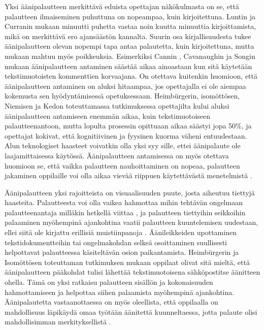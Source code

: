 \documentclass[utf8]{gradu3}
\begin{document}
Yksi äänipalautteen merkittävä eduista opettajan näkökulmasta on se, että palautteen ilmaiseminen puhuttuna on nopeampaa, kuin kirjoitettuna. Luntin ja Curranin \parencite[][]{areYouListening} mukaan minuutti puhetta vastaa noin kuutta minuuttia kirjoittamista, mikä on merkittävä ero ajansäästön kannalta. Suurin osa kirjallisuudesta tukee äänipalautteen olevan nopempi tapa antaa palautetta, kuin kirjoitettuna, mutta mukaan mahtuu myös poikkeuksia. Esimerkiksi Cannin \parencite[][]{engaging}, Cavanaughin ja Songin \parencite[][]{versus} mukaan äänipalautteen antaminen säästää aikaa ainoastaan kun sitä käytetään tekstimuotoisten kommenttien korvaajana. On otettava kuitenkin huomioon, että äänipalautteen antaminen on aluksi hitaampaa, jos opettajalla ei ole aiempaa kokemusta sen hyödyntämisessä opetuksessaan. Heimbürgerin, isomöttösen, Niemisen ja Kedon \parencite[][]{academics} toteuttamassa tutkimuksessa opettajilta kului aluksi äänipalautteen antamiseen enemmän aikaa, kuin tekstimuotoiseen palautteenantoon, mutta lopulta prosessin opittuaan aikaa säästyi jopa 50\%, ja opettajat kokivat, että kognitiivinen ja fyysinen kuorma väheni entuudestaan. Alun teknologiset haasteet voivatkin olla yksi syy sille, ettei äänipalaute ole laajamittaisessa käytössä. Äänipalautteen antamisessa on myös otettava huomioon se, että vaikka palautteen nauhoittaminen on nopeaa, palautteen jakaminen oppilaille voi olla aikaa vievää riippuen käytettävästä menetelmistä \parencite[][]{engaging}.

Äänipalautteen yksi rajoitteista on visuaalisuuden puute, josta aiheutuu tiettyjä haasteita. Palautteesta voi olla vaikea hahmottaa mihin tehtävän ongelmaan palautteenantaja milläkin hetkellä viittaa \parencite[][]{versus}, ja palautteen tiettyihin seikkoihin palaaminen myöhempinä ajankohtina vaatii palautteen kuuntelemisen uudestaan, ellei siitä ole kirjattu erillisiä muistiinpanoja \parencite[][]{evaluating}. Äänileikkeiden upottaminen tekstidokumentteihin tai ongelmakohdan selkeä osoittaminen suullisesti helpottavat palautteessa käsiteltävän osion paikantamista. Heimbürgerin ja Isomöttösen \parencite[][]{moderating} toteuttaman tutkimuksen mukaan oppilaat olivat sitä mieltä, että äänipalautteen pääkohdat tulisi lähettää tekstimuotoisena sähköpostitse äänitteen ohella. Tämä on yksi ratkaisu palautteen sisällön ja kokonaisuuden hahmottamiseen ja helpottaa siihen palaamista myöhempinä ajankohtina. Äänipalautetta vastaanottaessa on myös oleellista, että oppilaalla on mahdollisuus läpikäydä omaa työtään äänitettä kuunneltaessa, jotta palaute olisi mahdollisimman merkityksellistä \parencite[][]{usingAudio}.
\end{document}
